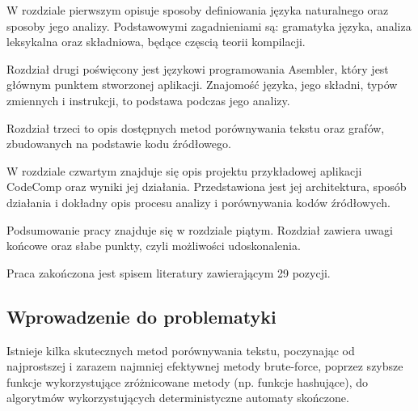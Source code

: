 \documentclass[a4paper,12pt,twoside]{article}
\begin{document}
W rozdziale pierwszym opisuje sposoby definiowania języka naturalnego oraz sposoby jego analizy. Podstawowymi zagadnieniami są: gramatyka języka, analiza leksykalna oraz składniowa, będące częscią teorii kompilacji.

Rozdział drugi poświęcony jest językowi programowania Asembler, który jest głównym punktem stworzonej aplikacji. Znajomość języka, jego składni, typów zmiennych i instrukcji, to podstawa podczas jego analizy.

Rozdział trzeci to opis dostępnych metod porównywania tekstu oraz grafów, zbudowanych na podstawie kodu źródłowego.

W rozdziale czwartym znajduje się opis projektu przykładowej aplikacji CodeComp oraz wyniki jej działania. Przedstawiona jest jej architektura, sposób działania i dokładny opis procesu analizy i porównywania kodów źródłowych.

Podsumowanie pracy znajduje się w rozdziale piątym. Rozdział zawiera uwagi końcowe oraz słabe punkty, czyli możliwości udoskonalenia.

Praca zakończona jest spisem literatury zawierającym 29 pozycji.
\newpage
\subsection{Wprowadzenie do problematyki}

Istnieje kilka skutecznych metod porównywania tekstu, poczynając od najprostszej i zarazem najmniej efektywnej metody brute-force, poprzez szybsze funkcje wykorzystujące zróżnicowane metody (np. funkcje hashujące), do algorytmów wykorzystujących deterministyczne automaty skończone.
\end{document}
